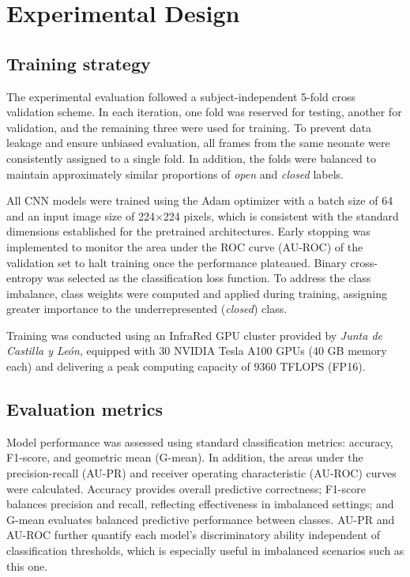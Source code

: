 \documentclass[runningheads]{llncs}
\begin{document}
\section{Experimental Design}
\label{sec:experimental_design}

\subsection{Training strategy}

The experimental evaluation followed a subject-independent 5-fold cross validation scheme. In each iteration, one fold was reserved for testing, another for validation, and the remaining three were used for training. To prevent data leakage and ensure unbiased evaluation, all frames from the same neonate were consistently assigned to a single fold. In addition, the folds were balanced to maintain approximately similar proportions of \textit{open} and \textit{closed} labels.

All CNN models were trained using the Adam optimizer with a batch size of 64 and an input image size of 224×224 pixels, which is consistent with the standard dimensions established for the pretrained architectures. Early stopping was implemented to monitor the area under the ROC curve (AU-ROC) of the validation set to halt training once the performance plateaued. Binary cross-entropy was selected as the classification loss function. To address the class imbalance, class weights were computed and applied during training, assigning greater importance to the underrepresented (\textit{closed}) class.

Training was conducted using an InfraRed GPU cluster provided by \textit{Junta de Castilla y León}, equipped with 30 NVIDIA Tesla A100 GPUs (40 GB memory each) and delivering a peak computing capacity of 9360 TFLOPS (FP16).

\subsection{Evaluation metrics}

Model performance was assessed using standard classification metrics: accuracy, F1-score, and geometric mean (G-mean). In addition, the areas under the precision-recall (AU-PR) and receiver operating characteristic (AU-ROC) curves were calculated. Accuracy provides overall predictive correctness; F1-score balances precision and recall, reflecting effectiveness in imbalanced settings; and G-mean evaluates balanced predictive performance between classes. AU-PR and AU-ROC further quantify each model's discriminatory ability independent of classification thresholds, which is especially useful in imbalanced scenarios such as this one.
\end{document}
